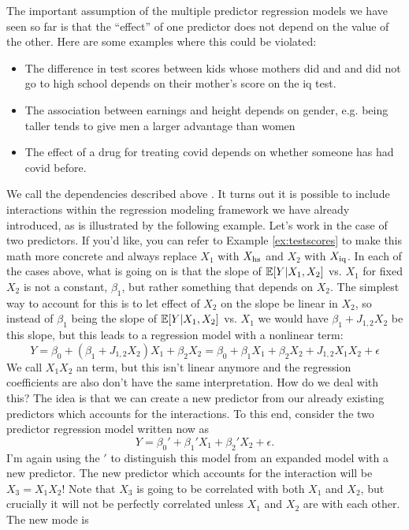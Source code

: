 The important assumption of the multiple predictor regression models we have seen so far is that the ``effect'' of one predictor does not depend on the value of the other. Here are some examples where this could be violated:
\begin{itemize}
\item The difference in test scores between kids whose mothers did and and did not go to high school depends on their mother's score on the iq test.
\item  The association between earnings and height depends on gender, e.g. being taller tends to give men a larger advantage than women
\item The effect of a drug for treating covid depends on whether someone has had covid before. 
\end{itemize}
We call the dependencies described above . 
It turns out it is possible to include interactions within the regression modeling framework we have already introduced, as is illustrated by the following example. 
 Let's work in the case of two predictors. If you'd like, you can refer to Example \ref{ex:testscores} to make this math more concrete and always replace $X_1$ with $X_{\rm hs}$ and $X_2$ with $X_{\rm iq}$.   In each of the cases above, what is going on is that the slope of $\mathbb E[Y|X_1,X_2]$ vs. $X_1$ for fixed $X_2$ is not a constant, $\beta_1$, but rather something that depends on $X_2$. The simplest way to account for this is to let effect of $X_2$ on the slope be linear in $X_2$, so instead of $\beta_1$ being the slope of $\mathbb E[Y|X_1,X_2]$ vs. $X_1$ we would have $\beta_1 +J_{1,2}X_2$ be this slope, but this leads to a regression model with a nonlinear term: 
\begin{equation*}
Y = \beta_0 +(\beta_1 + J_{1,2}X_2) X_1  + \beta_2 X_2 = \beta_0 + \beta_1 X_1 + \beta_2 X_2 + J_{1,2}X_1 X_2 + \epsilon 
\end{equation*}
We call $X_1X_2$ an  term, but this isn't linear anymore and the regression coefficients are also don't have the same interpretation. How do we deal with this? 
 The idea is that we can create a new predictor from our already existing predictors which accounts for the interactions. To this end, consider the two predictor regression model written now as 
\begin{equation*}
Y = \beta_0' + \beta_1' X_1 + \beta_2' X_2 + \epsilon.
\end{equation*} 
I'm again using the $'$ to distinguish this model from an expanded model with a new predictor. The new predictor which accounts for the interaction will be $X_3 = X_1X_2$! Note that $X_3$ is going to be correlated with both $X_1$ and $X_2$, but crucially it will not be perfectly correlated unless $X_1$ and $X_2$ are with each other. The new mode is 
